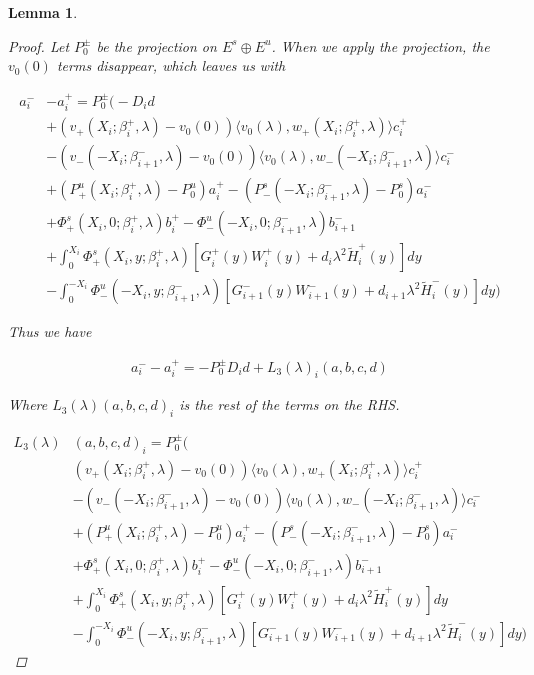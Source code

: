 \documentclass[12pt]{article}
\newtheorem{lemma}{Lemma}
\begin{document}
\begin{lemma}
\begin{proof}
Let $P_0^\pm$ be the projection on $E^s \oplus E^u$. When we apply the projection, the $v_0(0)$ terms disappear, which leaves us with

\begin{align*}
a_i^- &- a_i^+ = P_0^\pm \Big(-D_i d \\
&+(v_+(X_i; \beta_i^+, \lambda) - v_0(0)) \langle v_0(\lambda), w_+(X_i; \beta_i^+, \lambda) \rangle c_i^+ \\
&- (v_-(-X_i; \beta_{i+1}^-,\lambda) - v_0(0)) \langle v_0(\lambda), w_-(-X_i; \beta_{i+1}^-, \lambda) \rangle c_i^- \\
&+ (P^u_+(X_i; \beta_i^+, \lambda) - P_0^u)a_i^+ - (P^s_-(-X_i; \beta_{i+1}^-, \lambda) - P_0^s)a_i^- \\
&+ \Phi^s_+(X_i, 0; \beta_i^+, \lambda)b_i^+ - \Phi^u_-(-X_i, 0; \beta_{i+1}^-, \lambda)b_{i+1}^- \\
&+ \int_0^{X_i} \Phi^s_+(X_i, y; \beta_i^+, \lambda) [ G_i^+(y) W_i^+(y) + d_i \lambda^2 \tilde{H}_i^+(y) ] dy \\
&- \int_0^{-X_i} \Phi^u_-(-X_i, y; \beta_{i+1}^-, \lambda) [ G_{i+1}^-(y) W_{i+1}^-(y) + d_{i+1} \lambda^2 \tilde{H}_i^-(y) ] dy \Big)
\end{align*}

Thus we have

\begin{align*}
a_i^- - a_i^+ = -P_0^\pm D_i d + L_3(\lambda)_i(a, b, c, d)
\end{align*}

Where $L_3(\lambda)(a, b, c, d)_i$ is the rest of the terms on the RHS.

\begin{align*}
L_3(\lambda)&(a, b, c, d)_i = P_0^\pm \Big( \\
&(v_+(X_i; \beta_i^+, \lambda) - v_0(0)) \langle v_0(\lambda), w_+(X_i; \beta_i^+, \lambda) \rangle c_i^+ \\
&- (v_-(-X_i; \beta_{i+1}^-, \lambda) - v_0(0)) \langle v_0(\lambda), w_-(-X_i; \beta_{i+1}^-, \lambda) \rangle c_i^- \\
&+ (P^u_+(X_i; \beta_i^+, \lambda) - P_0^u)a_i^+ - (P^s_-(-X_i; \beta_{i+1}^-, \lambda) - P_0^s)a_i^- \\
&+ \Phi^s_+(X_i, 0; \beta_i^+, \lambda)b_i^+ - \Phi^u_-(-X_i, 0; \beta_{i+1}^-, \lambda)b_{i+1}^- \\
&+ \int_0^{X_i} \Phi^s_+(X_i, y; \beta_i^+, \lambda) [ G_i^+(y) W_i^+(y) + d_i \lambda^2 \tilde{H}_i^+(y) ] dy \\
&- \int_0^{-X_i} \Phi^u_-(-X_i, y; \beta_{i+1}^-, \lambda) [ G_{i+1}^-(y) W_{i+1}^-(y) + d_{i+1} \lambda^2 \tilde{H}_i^-(y) ] dy \Big)
\end{align*}


\end{proof}
\end{lemma}
\end{document}
